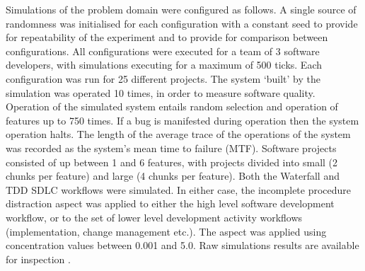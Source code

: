 \documentclass{llncs}
\begin{document}
Simulations of the problem domain were configured as follows.  A single source of randomness was initialised for each
configuration with a constant seed to provide for repeatability of the experiment and to provide for comparison between
configurations. All configurations were executed for a team of 3 software developers, with simulations executing for a
maximum of 500 ticks.  Each configuration was run for 25 different projects.  The system `built' by the simulation was
operated 10 times, in order to measure software quality.  Operation of the simulated system entails random selection and
operation of features up to 750 times.  If a bug is manifested during operation then the system operation halts.  The
length of the average trace of the operations of the system was recorded as the system's mean time to failure
(MTF). Software projects consisted of up between 1 and 6 features, with projects divided into small (2 chunks per
feature) and large (4 chunks per feature). Both the Waterfall and TDD SDLC workflows were simulated.  In either case,
the incomplete procedure distraction aspect was applied to either the high level software development workflow, or to
the set of lower level development activity workflows (implementation, change management etc.).  The aspect was applied
using concentration values between 0.001 and 5.0.  Raw simulations results are available for inspection
\citep{storer2016softdev-workflow-scm}.
\end{document}
